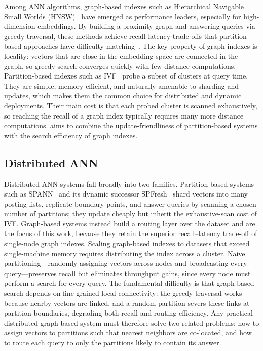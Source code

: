 \documentclass[sigconf,review,anonymous]{acmart}
\begin{document}
    Among ANN algorithms, graph-based indexes such as Hierarchical Navigable Small Worlds (HNSW)~\cite{malkov2018efficient} have emerged as performance leaders, especially for high-dimension embeddings. By building a proximity graph and answering queries via greedy traversal, these methods achieve recall-latency trade offs that partition-based approaches have difficulty matching~\cite{malkov2018efficient, jayaram2019diskann, li2020annsurvey, aumuller2020ann}. The key property of graph indexes is locality: vectors that are close in the embedding space are connected in the graph, so greedy search converges quickly with few distance computations. Partition-based indexes such as IVF~\cite{sivec2003ivf,jegou2011searching,douze2025faisslibrary} probe a subset of clusters at query time. They are simple, memory-efficient, and naturally amenable to sharding and updates, which makes them the common choice for distributed and dynamic deployments. Their main cost is that each probed cluster is scanned exhaustively, so reaching the recall of a graph index typically requires many more distance computations. \SystemName{} aims to combine the update-friendliness of partition-based systems with the search efficiency of graph indexes. %

\subsection{Distributed ANN}
\label{sec:distributed-ann}
    Distributed ANN systems fall broadly into two families. Partition-based systems such as SPANN~\cite{chen2021spann} and its dynamic successor SPFresh~\cite{xu2023spfresh} shard vectors into many posting lists, replicate boundary points, and answer queries by scanning a chosen number of partitions; they update cheaply but inherit the exhaustive-scan cost of IVF. Graph-based systems instead build a routing layer over the dataset and are the focus of this work, because they retain the superior recall--latency trade-off of single-node graph indexes. Scaling graph-based indexes to datasets that exceed single-machine memory requires distributing the index across a cluster. Naive partitioning---randomly assigning vectors across nodes and broadcasting every query---preserves recall but eliminates throughput gains, since every node must perform a search for every query. The fundamental difficulty is that graph-based search depends on fine-grained local connectivity: the greedy traversal works because nearby vectors are linked, and a random partition severs these links at partition boundaries, degrading both recall and routing efficiency. Any practical distributed graph-based system must therefore solve two related problems: how to assign vectors to partitions such that nearest neighbors are co-located, and how to route each query to only the partitions likely to contain its answer.
    
\end{document}
